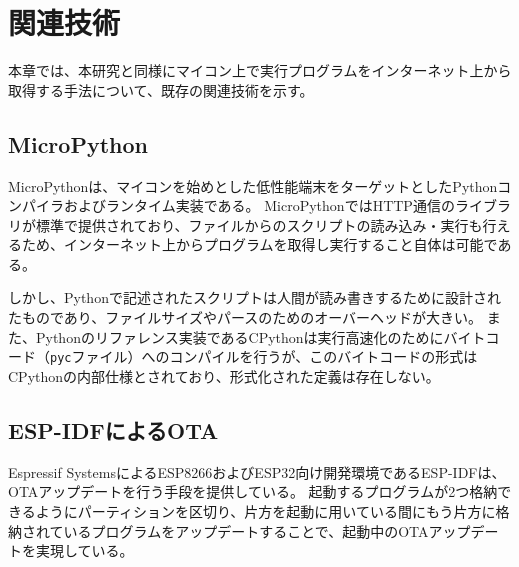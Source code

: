 \chapter{関連技術}
\label{chap:related_works}

本章では、本研究と同様にマイコン上で実行プログラムをインターネット上から取得する手法について、既存の関連技術を示す。

\section{MicroPython}

MicroPythonは、マイコンを始めとした低性能端末をターゲットとしたPythonコンパイラおよびランタイム実装である\cite{micropython}。
MicroPythonではHTTP通信のライブラリが標準で提供されており、ファイルからのスクリプトの読み込み・実行も行えるため、インターネット上からプログラムを取得し実行すること自体は可能である。

しかし、Pythonで記述されたスクリプトは人間が読み書きするために設計されたものであり、ファイルサイズやパースのためのオーバーヘッドが大きい。
また、Pythonのリファレンス実装であるCPythonは実行高速化のためにバイトコード（{\tt pyc}ファイル）へのコンパイルを行うが、このバイトコードの形式はCPythonの内部仕様とされており、形式化された定義は存在しない\cite{python_bytecode}。

\section{ESP-IDFによるOTA}

Espressif SystemsによるESP8266およびESP32向け開発環境であるESP-IDF\cite{esp_idf}は、OTAアップデートを行う手段を提供している\cite{esp_ota}。
起動するプログラムが2つ格納できるようにパーティションを区切り、片方を起動に用いている間にもう片方に格納されているプログラムをアップデートすることで、起動中のOTAアップデートを実現している。

